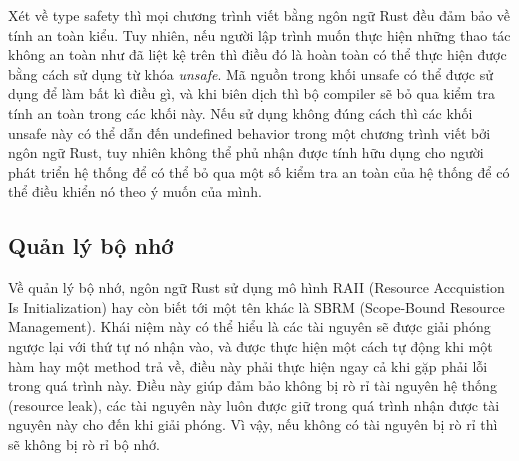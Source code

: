 Xét về type safety thì mọi chương trình viết bằng ngôn ngữ Rust đều đảm bảo về tính an toàn kiểu. Tuy nhiên, nếu người lập trình muốn thực hiện những thao tác không an toàn như đã liệt kệ trên thì điều đó là hoàn toàn có thể thực hiện được bằng cách sử dụng từ khóa \emph{unsafe}.
Mã nguồn trong khối unsafe có thể được sử dụng để làm bất kì điều gì, và khi biên dịch thì bộ compiler sẽ bỏ qua kiểm tra tính an toàn trong các khối này.
Nếu sử dụng không đúng cách thì các khối unsafe này có thể dẫn đến undefined behavior trong một chương trình viết bởi ngôn ngữ Rust, tuy nhiên không thể phủ nhận được tính hữu dụng cho người phát triển hệ thống để có thể bỏ qua một số kiểm tra an toàn của hệ thống để có thể điều khiển nó theo ý muốn của mình.

\subsection{Quản lý bộ nhớ}
Về quản lý bộ nhớ, ngôn ngữ Rust sử dụng mô hình RAII (Resource Accquistion Is Initialization) hay còn biết tới một tên khác là SBRM (Scope-Bound Resource Management).
Khái niệm này có thể hiểu là các tài nguyên sẽ được giải phóng ngược lại với thứ tự nó nhận vào, và được thực hiện một cách tự động khi một hàm hay một method trả về, điều này phải thực hiện ngay cả khi gặp phải lỗi trong quá trình này.
Điều này giúp đảm bảo không bị rò rỉ tài nguyên hệ thống (resource leak), các tài nguyên này luôn được giữ trong quá trình nhận được tài nguyên này cho đến khi giải phóng. Vì vậy, nếu không có tài nguyên bị rò rỉ thì sẽ không bị rò rỉ bộ nhớ.

